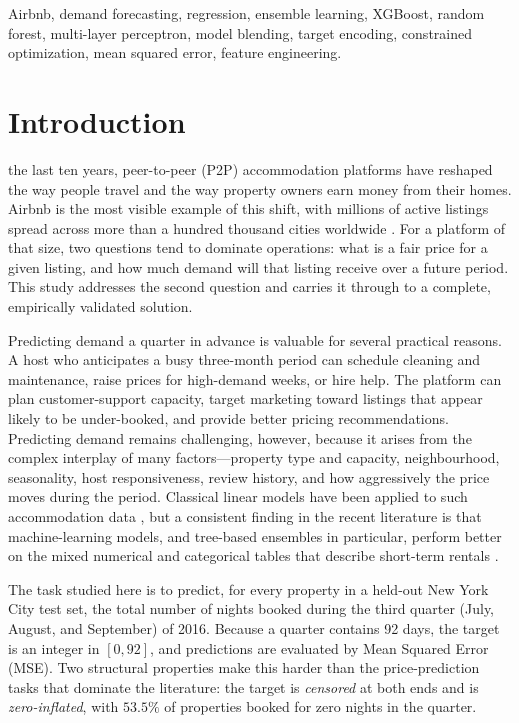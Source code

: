 \documentclass[journal]{IEEEtran}
\begin{document}
\begin{IEEEkeywords}
Airbnb, demand forecasting, regression, ensemble learning, XGBoost, random
forest, multi-layer perceptron, model blending, target encoding, constrained
optimization, mean squared error, feature engineering.
\end{IEEEkeywords}

\section{Introduction}
 the last ten years, peer-to-peer (P2P) accommodation
platforms have reshaped the way people travel and the way property owners earn
money from their homes. Airbnb is the most visible example of this shift, with
millions of active listings spread across more than a hundred thousand cities
worldwide \cite{adamiak2018}. For a platform of that size, two questions tend
to dominate operations: what is a fair price for a given listing, and how much
demand will that listing receive over a future period. This study addresses the
second question and carries it through to a complete, empirically validated
solution.

Predicting demand a quarter in advance is valuable for several practical
reasons. A host who anticipates a busy three-month period can schedule cleaning
and maintenance, raise prices for high-demand weeks, or hire help. The platform
can plan customer-support capacity, target marketing toward listings that appear
likely to be under-booked, and provide better pricing recommendations.
Predicting demand remains challenging, however, because it arises from the
complex interplay of many factors---property type and capacity, neighbourhood,
seasonality, host responsiveness, review history, and how aggressively the price
moves during the period. Classical linear models have been applied to such
accommodation data \cite{gunter2018,wang2017}, but a consistent finding in the
recent literature is that machine-learning models, and tree-based ensembles in
particular, perform better on the mixed numerical and categorical tables that
describe short-term rentals \cite{tang2024,camatti2024,kalehbasti2019}.

The task studied here is to predict, for every property in a held-out New York
City test set, the total number of nights booked during the third quarter (July,
August, and September) of 2016. Because a quarter contains 92 days, the target is
an integer in $[0,92]$, and predictions are evaluated by Mean Squared Error
(MSE). Two structural properties make this harder than the price-prediction
tasks that dominate the literature: the target is \emph{censored} at both ends
and is \emph{zero-inflated}, with $53.5\%$ of properties booked for zero nights
in the quarter.
\end{document}
